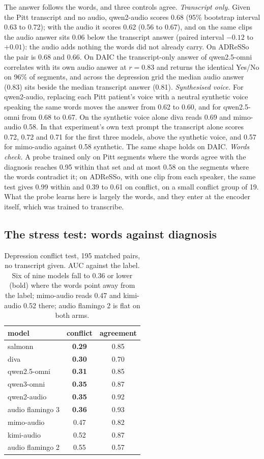 \documentclass[conference]{IEEEtran}
\begin{document}
The answer follows the words, and three controls agree. \emph{Transcript only.} Given the Pitt transcript and no audio, qwen2-audio
scores 0.68 (95\% bootstrap interval 0.63 to 0.72); with the audio it scores 0.62 (0.56 to 0.67),
and on the same clips the audio answer sits 0.06 below the transcript answer (paired interval $-0.12$
to $+0.01$): the audio adds nothing the words did not already carry. On ADReSSo the pair is 0.68 and
0.66. On DAIC the transcript-only answer of qwen2.5-omni correlates with its own audio answer at
$r = 0.83$ and returns the identical Yes/No on 96\% of segments, and across the depression grid the
median audio answer (0.83) sits beside the median transcript answer (0.81). \emph{Synthesised voice.} For qwen2-audio, replacing each Pitt patient's voice with a neutral
synthetic voice speaking the same words moves the answer from 0.62 to 0.60, and for qwen2.5-omni
from 0.68 to 0.67. On the synthetic voice alone diva reads 0.69 and mimo-audio 0.58. In that
experiment's own text prompt the transcript alone scores 0.72, 0.72 and 0.71 for the first three
models, above the synthetic voice, and 0.57 for mimo-audio against 0.58 synthetic. The same shape holds on DAIC. \emph{Words check.} A
probe trained only on Pitt segments where the words agree with the diagnosis reaches 0.95 within that
set and at most 0.58 on the segments where the words contradict it; on ADReSSo, with one clip from each speaker,
the same test gives 0.99 within and 0.39 to 0.61 on conflict, on a small conflict group of 19. What the probe learns here is largely the words, and they enter at the encoder itself, which was
trained to transcribe.

\subsection{The stress test: words against diagnosis}

\begin{table}[t]
\centering\footnotesize
\caption{Depression conflict test, 195 matched pairs, no transcript given. AUC against the
label. Six of nine models fall to 0.36 or lower (bold) where the words point away from the label;
mimo-audio reads 0.47 and kimi-audio 0.52 there; audio flamingo 2 is flat on both arms.}
\label{tab:conflict}
\begin{tabular}{@{}lcc@{}}
\toprule
model & conflict & agreement \\
\midrule
salmonn            & \textbf{0.29} & 0.85 \\
diva               & \textbf{0.30} & 0.70 \\
qwen2.5-omni       & \textbf{0.31} & 0.85 \\
qwen3-omni         & \textbf{0.35} & 0.87 \\
qwen2-audio        & \textbf{0.35} & 0.92 \\
audio flamingo 3   & \textbf{0.36} & 0.93 \\
mimo-audio         & 0.47 & 0.82 \\
kimi-audio         & 0.52 & 0.87 \\
audio flamingo 2   & 0.55 & 0.57 \\
\bottomrule
\end{tabular}
\end{table}
\end{document}
